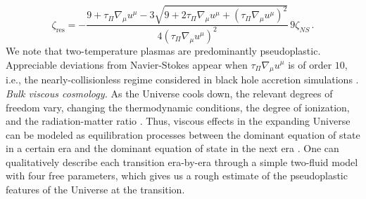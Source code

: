 \documentclass[aps,prl,noshowpacs,noshowkeys,floatfix,superscriptaddress,singlecolum,nofootinbib]{revtex4-2}
\theoremstyle{definition}
\theoremstyle{theorem}
\begin{document}
\begin{equation}
    \zeta_{\text{res}} = - \dfrac{9{+}\tau_\Pi \nabla_\mu u^\mu {-}3\sqrt{9{+}2\tau_\Pi \nabla_\mu u^\mu {+}(\tau_\Pi \nabla_\mu u^\mu)^2}}{4(\tau_\Pi \nabla_\mu u^\mu)^2} \, 9\zeta_{NS} \, .
\end{equation}
We note that two-temperature plasmas are predominantly pseudoplastic. Appreciable deviations from Navier-Stokes appear when $\tau_\Pi \nabla_\mu u^\mu$ is of order $10$, i.e., 
the nearly-collisionless regime considered in black hole accretion simulations \cite{Chandra:2015iza,Foucart:2017axc}.\\

\noindent\textit{Bulk viscous cosmology.} As the Universe cools down, the relevant degrees of freedom vary, changing the thermodynamic conditions, the degree of ionization, and the radiation-matter ratio \cite{Weinberg_GR_book,Dodelson2003}. Thus, viscous effects in the expanding Universe can be modeled as equilibration processes between the dominant equation of state in a certain era and the dominant equation of state in the next era \cite{Weinberg1971,UdeyIsrael1982}. One can qualitatively describe each transition era-by-era through a simple two-fluid model with four free parameters, which gives us a rough estimate of the pseudoplastic features of the Universe at the transition.
\end{document}
